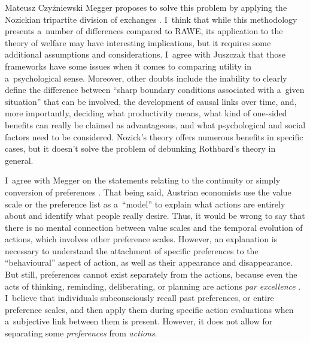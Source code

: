 \begin{newrevengenv}{Mateusz Czyżniewski}
Megger proposes to solve this problem by applying the Nozickian 
\parencite[][pp.66–67]{megger_sprawiedliwosc_2021} %
 tripartite division of exchanges 
\parencite[][pp.84–87 \mbox{[orig. 1974]}]{nozick_anarchy_1999}. %
 I~think that while this methodology presents a~number of differences compared to RAWE, its application to the theory of welfare may have interesting implications, but it requires some additional assumptions and considerations. I~agree with Juszczak 
\parencite*[][]{juszczak_o_2021} %
 that those frameworks have some issues when it comes to comparing utility in a~psychological sense. Moreover, other doubts include the inability to clearly define the difference between ``sharp boundary conditions associated with a~given situation'' that can be involved, the development of causal links over time, and, more importantly, deciding what productivity means, what kind of one-sided benefits can really be claimed as advantageous, and what psychological and social factors need to be considered. Nozick's theory offers numerous benefits in specific cases, but it doesn't solve the problem of debunking Rothbard's theory in general.



I~agree with Megger on the statements relating to the continuity or simply conversion of preferences 
\parencite[][pp.68–69]{megger_sprawiedliwosc_2021}. %
 That being said, Austrian economists use the value scale or the preference list as a~``model'' to explain what actions are entirely about and identify what people really desire. Thus, it would be wrong to say that there is no mental connection between value scales and the temporal evolution of actions, which involves other preference scales. However, an explanation is necessary to understand the attachment of specific preferences to the ``behavioural'' aspect of action, as well as their appearance and disappearance. But still, preferences cannot exist separately from the actions, because even the acts of thinking, reminding, deliberating, or planning are actions \textit{par excellence} 
\parencite[][pp.11–72]{mises_human_1998}. %
 I~believe that individuals subconsciously recall past preferences, or entire preference scales, and then apply them during specific action evaluations when a~subjective link between them is present. However, it does not allow for separating some \textit{preferences} from \textit{actions}.




\end{newrevengenv}
